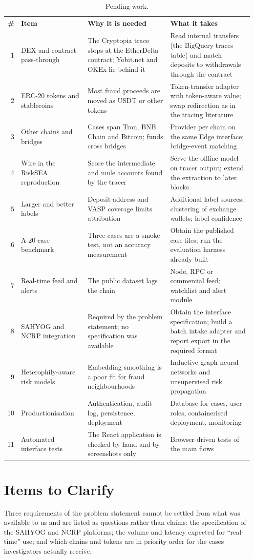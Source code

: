 \begin{table}[H]
\centering\small\singlespacing
\begin{tabular}{r p{3.3cm} p{4.3cm} p{4.0cm}}
\toprule
\textbf{\#} & \textbf{Item} & \textbf{Why it is needed} & \textbf{What it takes}\\
\midrule
1 & DEX and contract pass-through & The Cryptopia trace stops at the EtherDelta contract; Yobit.net and OKEx lie behind it & Read internal transfers (the BigQuery traces table) and match deposits to withdrawals through the contract\\
2 & ERC-20 tokens and stablecoins & Most fraud proceeds are moved as USDT or other tokens & Token-transfer adapter with token-aware value; swap redirection as in the tracing literature\\
3 & Other chains and bridges & Cases span Tron, BNB Chain and Bitcoin; funds cross bridges & Provider per chain on the same Edge interface; bridge-event matching\\
4 & Wire in the RiskSEA reproduction & Score the intermediate and mule accounts found by the tracer & Serve the offline model on tracer output; extend the extraction to later blocks\\
5 & Larger and better labels & Deposit-address and VASP coverage limits attribution & Additional label sources; clustering of exchange wallets; label confidence\\
6 & A 20-case benchmark & Three cases are a smoke test, not an accuracy measurement & Obtain the published case files; run the evaluation harness already built\\
7 & Real-time feed and alerts & The public dataset lags the chain & Node, RPC or commercial feed; watchlist and alert module\\
8 & SAHYOG and NCRP integration & Required by the problem statement; no specification was available & Obtain the interface specification; build a batch intake adapter and report export in the required format\\
9 & Heterophily-aware risk models & Embedding smoothing is a poor fit for fraud neighbourhoods & Inductive graph neural networks and unsupervised risk propagation\\
10 & Productionisation & Authentication, audit log, persistence, deployment & Database for cases, user roles, containerised deployment, monitoring\\
11 & Automated interface tests & The React application is checked by hand and by screenshots only & Browser-driven tests of the main flows\\
\bottomrule
\end{tabular}
\caption{Pending work.}
\label{tab:pending}
\end{table}

\section{Items to Clarify}
Three requirements of the problem statement cannot be settled from what was available to us and are listed as questions rather than claims: the specification of the SAHYOG and NCRP platforms; the volume and latency expected for ``real-time'' use; and which chains and tokens are in priority order for the cases investigators actually receive.

